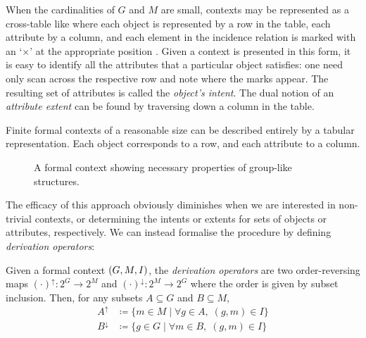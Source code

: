 When the cardinalities of $G$ and $M$ are small, contexts may be represented as a cross-table like  where each object is represented by a row in the table, each attribute by a column, and each element in the incidence relation is marked with an `$\times$' at the appropriate position \cite[pp. 17]{ganter1999formal}. Given a context is presented in this form, it is easy to identify all the attributes that a particular object satisfies: one need only scan across the respective row and note where the marks appear. The resulting set of attributes is called the \textit{object's intent}. The dual notion of an \textit{attribute extent} can be found by traversing down a column in the table.
\begin{example}
  \label{example:first-example-formal-context}
  Finite formal contexts of a reasonable size can be described entirely by a tabular representation. Each object corresponds to a row, and each attribute to a column.

  \begin{figure}[H]
    \centering
    \small
    \begin{cxt}
          
    \end{cxt}
    \caption{A formal context showing necessary properties of group-like structures.}
    \label{context:formal-context-group-structures}
  \end{figure}
\end{example}

The efficacy of this approach obviously diminishes when we are interested in non-trivial contexts, or determining the intents or extents for sets of objects or attributes, respectively. We can instead formalise the procedure by defining \textit{derivation operators}:

\begin{definition}
     \label{definition:derivation-operators} 
  Given a formal context $(G,M,\mathrel{I})$, the \textit{derivation operators} are two order-reversing maps $(\cdot)^\uparrow : 2^G \to 2^M$ and $(\cdot)^\downarrow : 2^M \to 2^G$ where the order is given by subset inclusion. Then, for any subsets $A \subseteq G$ and $B \subseteq M$,
  \begin{align*}
       A^\uparrow & \coloneqq \{m \in M \mid \forall g \in A, \; (g,m) \in I\} \\
       B^\downarrow & \coloneqq \{g \in G \mid \forall m \in B, \; (g,m) \in I\}
  \end{align*}
\end{definition}

